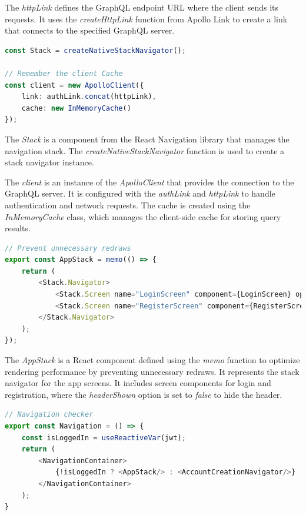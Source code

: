 The \textit{httpLink} defines the GraphQL endpoint URL where the client sends its requests. It uses the \textit{createHttpLink} function from Apollo Link to create a link that connects to the specified GraphQL server.


\begin{lstlisting}[language=TypeScript]
const Stack = createNativeStackNavigator();

// Remember the client Cache
const client = new ApolloClient({
    link: authLink.concat(httpLink),
    cache: new InMemoryCache()
});
\end{lstlisting}

The \textit{Stack} is a component from the React Navigation library that manages the navigation stack. The \textit{createNativeStackNavigator} function is used to create a stack navigator instance.

The \textit{client} is an instance of the \textit{ApolloClient} that provides the connection to the GraphQL server. It is configured with the \textit{authLink} and \textit{httpLink} to handle authentication and network requests. The cache is created using the \textit{InMemoryCache} class, which manages the client-side cache for storing query results.


\begin{lstlisting}[language=TypeScript]
// Prevent unnecessary redraws
export const AppStack = memo(() => {
    return (
        <Stack.Navigator>
            <Stack.Screen name="LoginScreen" component={LoginScreen} options={{ headerShown: false }}/>
            <Stack.Screen name="RegisterScreen" component={RegisterScreen} options={{ headerShown: false }}/>
        </Stack.Navigator>
    );
});
\end{lstlisting}

The \textit{AppStack} is a React component defined using the \textit{memo} function to optimize rendering performance by preventing unnecessary redraws. It represents the stack navigator for the app screens. It includes screen components for login and registration, where the \textit{headerShown} option is set to \textit{false} to hide the header.


\begin{lstlisting}[language=TypeScript]
// Navigation checker
export const Navigation = () => {
    const isLoggedIn = useReactiveVar(jwt);
    return (
        <NavigationContainer>
            {!isLoggedIn ? <AppStack/> : <AccountCreationNavigator/>}
        </NavigationContainer>
    );
}
\end{lstlisting}

